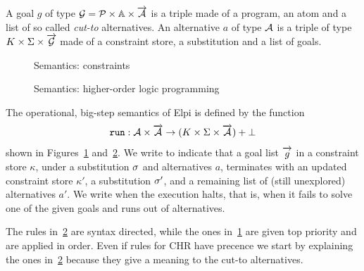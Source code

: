 \documentclass[a4paper, 11pt]{book}
\begin{document}
A goal $g$ of type $\g = \PROG \times \ATOM \times \vecL{\alt}$
is a triple made of a program, an atom and a list of
so called \emph{cut-to} alternatives.
An alternative $a$ of type $\mathcal{A}$ is a triple of type $K \times \Sigma \times \vecL{\g}$
made of a constraint store, a substitution and a list of goals.

\begin{figure}[p]
    \centering

  \caption{Semantics: constraints}
    \label{fig:basic-interp-c}
\end{figure}

  \begin{figure}[p]
  \centering
%


  
  \caption{Semantics: higher-order logic programming}
    \label{fig:basic-interp-l}
\end{figure}



The operational, big-step semantics of Elpi is defined by the function
$$
\run{} : \alt \times \vecL{\alt} \to (K  \times \Sigma \times \vecL{\alt}) + \bot
$$
shown in Figures~\cref{fig:basic-interp-c} and~\cref{fig:basic-interp-l}.
We write 
to indicate that a goal list $\vecL{g}$ in a constraint store $\kappa$, under a
substitution $\sigma$ and alternatives $a$, terminates with an updated
constraint store $\kappa'$, a substitution $\sigma'$, and a remaining list of
(still unexplored) alternatives $a'$. We write 
when the execution halts, that is, when it fails to solve one of the given goals
and runs out of alternatives.

The rules in~\cref{fig:basic-interp-l} are syntax directed, while the ones
in~\cref{fig:basic-interp-c} are given top priority and are applied in order. 
Even if rules for CHR have precence we start by explaining the ones
in~\cref{fig:basic-interp-l} because they give a meaning to the cut-to
alternatives.
\end{document}
